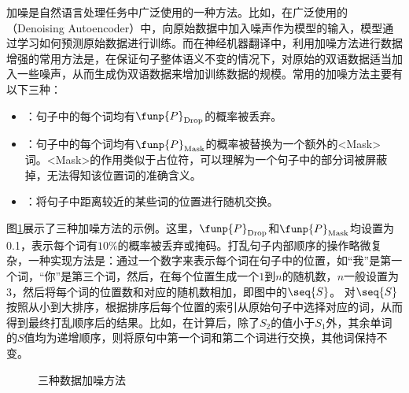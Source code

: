 \parinterval 加噪是自然语言处理任务中广泛使用的一种方法。比如，在广泛使用的{\small{}}（Denoising Autoencoder）中，向原始数据中加入噪声作为模型的输入，模型通过学习如何预测原始数据进行训练。而在神经机器翻译中，利用加噪方法进行数据增强的常用方法是，在保证句子整体语义不变的情况下，对原始的双语数据适当加入一些噪声，从而生成伪双语数据来增加训练数据的规模。常用的加噪方法主要有以下三种：
\begin{itemize}
    \vspace{0.5em}
    \item {\small{}}：句子中的每个词均有$\funp{P}_{\rm{Drop}}$的概率被丢弃。
    \vspace{0.5em}
    \item {\small{}}：句子中的每个词均有$\funp{P}_{\rm{Mask}}$的概率被替换为一个额外的<Mask>词。<Mask>的作用类似于占位符，可以理解为一个句子中的部分词被屏蔽掉，无法得知该位置词的准确含义。
    \vspace{0.5em}
    \item {\small{}}：将句子中距离较近的某些词的位置进行随机交换。
    \vspace{0.5em}
\end{itemize}

\parinterval 图\ref{fig:16-3}展示了三种加噪方法的示例。这里，$\funp{P}_{\rm{Drop}}$和$\funp{P}_{\rm{Mask}}$均设置为0.1，表示每个词有$10\%$的概率被丢弃或掩码。打乱句子内部顺序的操作略微复杂，一种实现方法是：通过一个数字来表示每个词在句子中的位置，如“我”是第一个词，“你”是第三个词，然后，在每个位置生成一个$1$到$n$的随机数，$n$一般设置为3，然后将每个词的位置数和对应的随机数相加，即图中的$\seq{S}$。 对$\seq{S}$ 按照从小到大排序，根据排序后每个位置的索引从原始句子中选择对应的词，从而得到最终打乱顺序后的结果。比如，在计算后，除了$S_2$的值小于$S_1$外，其余单词的$S$值均为递增顺序，则将原句中第一个词和第二个词进行交换，其他词保持不变。

\begin{figure}[htp]
    \centering
    
    \caption{三种数据加噪方法}
    \label{fig:16-3}
\end{figure}

